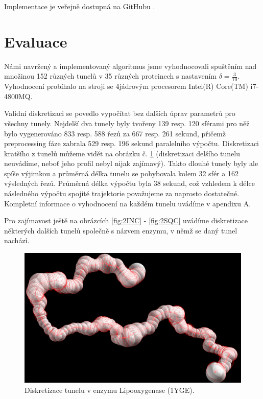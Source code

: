 Implementace je veřejně dostupná na GitHubu \cite{discretizer}.





\section{Evaluace} \label{subsec:evaluation}
Námi navržený a implementovaný algoritmus jsme vyhodnocovali spuštěním nad
množinou 152 různých tunelů v 35 různých proteinech s nastavením $ \delta = \frac{3}{10} $.
Vyhodnocení probíhalo na stroji se 4jádrovým procesorem Intel(R) Core(TM) i7-4800MQ.

Validní diskretizaci se povedlo vypočítat bez dalších úprav parametrů pro všechny
tunely. Nejdelší dva tunely byly tvořeny 139 resp. 120 sférami pro něž bylo
vygenerováno 833 resp. 588 řezů za 667 resp. 261 sekund, přičemž preprocessing
fáze zabrala 529 resp. 196 sekund paralelního výpočtu. Diskretizaci kratšího
z tunelů můžeme vidět na obrázku č. \ref{fig:1YGE} (diskretizaci delšího tunelu
neuvádíme, neboť jeho profil nebyl nijak zajímavý). Takto dlouhé tunely byly ale
spíše výjimkou a průměrná délka tunelu se pohybovala kolem 32 sfér a 162
výsledných řezů. Průměrná délka výpočtu byla 38 sekund, což vzhledem k délce
následného výpočtu spojité trajektorie považujeme za naprosto dostatečné.
Kompletní informace o vyhodnocení na každém tunelu uvádíme v apendixu A.

Pro zajímavost ještě na obrázcích \ref{fig:2INC} - \ref{fig:2SQC} uvádíme
diskretizace některých dalších tunelů společně s názvem enzymu, v němž se daný
tunel nachází.

\begin{figure}[ht]
    \centering
    \includegraphics[width=.75\textwidth]{img/1YGE.png}
    \caption{Diskretizace tunelu v enzymu Lipooxygenase (1YGE).}
  \centering
  \label{fig:1YGE}
\end{figure}

